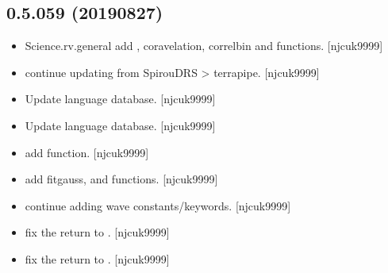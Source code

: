 \documentclass[a4paper,10pt,english]{report}
\begin{document}
\subsection{0.5.059 (2019\sphinxhyphen{}08\sphinxhyphen{}27)}
\label{\detokenize{misc/changelog:id102}}\begin{itemize}
\item {} 
Science.rv.general \sphinxhyphen{} add , coravelation, 
 correlbin and  functions. {[}njcuk9999{]}

\item {} 
 \sphinxhyphen{} continue updating from SpirouDRS \textendash{}\textgreater{} terrapipe.
{[}njcuk9999{]}

\item {} 
Update language database. {[}njcuk9999{]}

\item {} 
Update language database. {[}njcuk9999{]}

\item {} 
 \sphinxhyphen{} add  function. {[}njcuk9999{]}

\item {} 
 \sphinxhyphen{} add fitgauss,  and  functions. {[}njcuk9999{]}

\item {} 
 \sphinxhyphen{} continue adding wave constants/keywords.
{[}njcuk9999{]}

\item {} 
 \sphinxhyphen{} fix the return to . {[}njcuk9999{]}

\item {} 
 \sphinxhyphen{} fix the return to . {[}njcuk9999{]}

\end{itemize}
\end{document}
